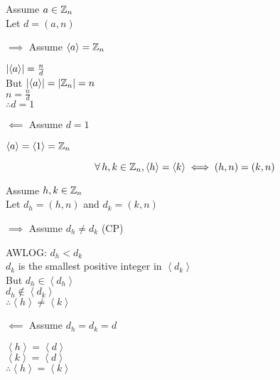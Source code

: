 \documentclass[letterpaper,12pt,fleqn]{article}
\newcommand{\cycle}[1]{\left<#1\right>}
\begin{document}
\begin{theproof}
  Assume $a\in\mathbb{Z}_n$ \\
  Let $d=(a,n)$

  \begin{description}
    \begin{minipage}[t]{3in}
    \item $\implies$ Assume $\cycle{a}=\Z_n$

      $\abs{\cycle{a}}=\frac{n}{d}$ \\
      But $\abs{\cycle{a}}=\abs{\Z_n}=n$ \\
      $n=\frac{n}{d}$ \\
      $\therefore d=1$
    \end{minipage}
    \begin{minipage}[t]{3in}
    \item $\impliedby$ Assume $d=1$

      $\cycle{a}=\cycle{1}=\Z_n$
    \end{minipage}
  \end{description}
\end{theproof}

\begin{corollary}
  \listbreak
  \[\forall\,h,k\in\Z_n,\cycle{h}=\cycle{k}\iff(h,n)=(k,n)\]
\end{corollary}

\begin{theproof}
  Assume $h,k\in\mathbb{Z}_n$ \\
  Let $d_h=(h,n)$ and $d_k=(k,n)$ \\
  \begin{description}
    \begin{minipage}[t]{3.5in}
    \item $\implies$ Assume $d_h\ne d_k$ (CP)

      AWLOG: $d_h<d_k$ \\
      $d_k$ is the smallest positive integer in $\cycle{d_k}$ \\
      But $d_h\in\cycle{d_h}$ \\
      $d_h\notin\cycle{d_k}$ \\
      $\therefore\cycle{h}\ne\cycle{k}$
    \end{minipage}
    \begin{minipage}[t]{3in}
    \item $\impliedby$ Assume $d_h=d_k=d$

      $\cycle{h}=\cycle{d}$ \\
      $\cycle{k}=\cycle{d}$ \\
      $\therefore\cycle{h}=\cycle{k}$
    \end{minipage}
  \end{description}
\end{theproof}
\end{document}
